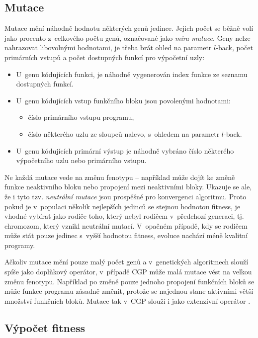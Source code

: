 \subsection{Mutace}

Mutace mění náhodně hodnotu některých genů jedince. Jejich počet se běžně volí jako procento z~celkového počtu genů, označované jako \emph{míra mutace}. Geny nelze nahrazovat libovolnými hodnotami, je třeba brát ohled na parametr $l$-back, počet primárních vstupů a počet dostupných funkcí pro výpočetní uzly:

\begin{itemize}
    \item U~genu kódujících funkci, je náhodně vygenerován index funkce ze seznamu dostupných funkcí.
    \item U~genu kódujících vstup funkčního bloku jsou povolenými hodnotami:
        \begin{itemize}
            \item číslo primárního vstupu programu,
            \item číslo některého uzlu ze sloupců nalevo, s~ohledem na parametr $l$-back.
        \end{itemize}
    \item U~genu kódujících primární výstup je náhodně vybráno číslo některého výpočetního uzlu nebo primárního vstupu.
\end{itemize}

Ne každá mutace vede na změnu fenotypu -- například může dojít ke změně funkce neaktivního bloku nebo propojení mezi neaktivními bloky. Ukazuje se ale, že i tyto tzv. \emph{neutrální mutace} jsou prospěšné pro konvergenci algoritmu. Proto pokud je v~populaci několik nejlepších jedinců se stejnou hodnotou fitness, je vhodné vybírat jako rodiče toho, který nebyl rodičem v~předchozí generaci, tj. chromozom, který vznikl neutrální mutací. V~opačném případě, kdy se rodičem může stát pouze jedinec s~vyšší hodnotou fitness, evoluce nachází méně kvalitní programy.

Ačkoliv mutace mění pouze malý počet genů a v~genetických algoritmech slouží spíše jako doplňkový operátor, v~případě CGP může malá mutace vést na velkou změnu fenotypu. Například po změně pouze jednoho propojení funkčních bloků se může funkce programu zásadně změnit, protože se najednou stane aktivními větší množství funkčních bloků. Mutace tak v~CGP slouží i jako extenzivní operátor \cite{ZelenaCGP, Modra}.

\subsection{Výpočet fitness}
\label{secFitnessCalc}


